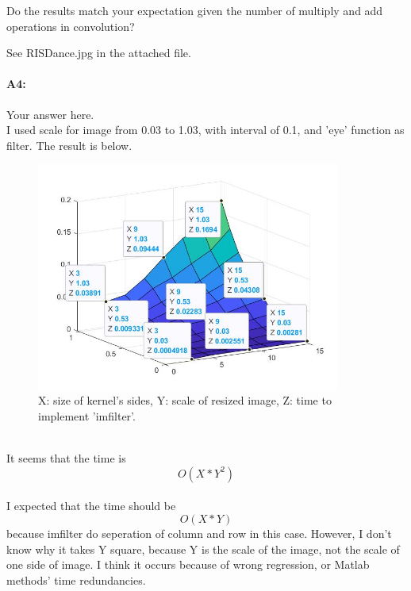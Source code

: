 	Do the results match your expectation given the number of multiply and add operations in convolution?
	
	See RISDance.jpg in the attached file.
	
	\paragraph{A4:} Your answer here.
	\\ I used scale for image from 0.03 to 1.03, with interval of 0.1, and 'eye' function as filter. The result is below.
	\begin{figure}[h]
    \centering
    \includegraphics[width=10cm]{questions/surf.jpg}
    \caption{ X: size of kernel's sides, Y: scale of resized image, Z: time to implement 'imfilter'.}
    \end{figure}
	\\It seems that the time is $$O(X*Y^2)$$\\
	I expected that the time should be  $$O(X*Y)$$  because imfilter do seperation of column and row in this case. However, I don't know why it takes Y square, because Y is the scale of the image, not the scale of one side of image. I think it occurs because of wrong regression, or Matlab methods' time redundancies.
	
	
	
	
	
	
